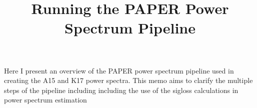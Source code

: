 \documentclass[onecolumn]{emulateapj}
\begin{document}
\title{Running the PAPER Power Spectrum Pipeline}



	
	
	
\maketitle	
Here I present an overview of the PAPER power spectrum pipeline used in creating the A15 and K17 power spectra. This memo aims to clarify the multiple steps of the pipeline including including the use of the sigloss calculations in power spectrum estimation
\newline
\end{document}
